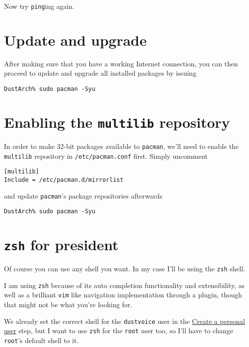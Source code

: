 \documentclass[9pt]{report}
\newenvironment{NOTE}
{\begin{tcolorbox}[colback=admonitionBG,coltitle=draculaFG,colframe=draculaBlue,colbacktitle=draculaBlue,title=NOTE]}
{\end{tcolorbox}}
\begin{document}
Now try \texttt{ping}ing again.



\newpage

\hypertarget{x-update-and-upgrade}{\section{Update and upgrade}}
After making sure that you have a working Internet connection, you can then proceed to update and upgrade all installed packages by issuing


\begin{verbatim}
DustArch% sudo pacman -Syu
\end{verbatim}


\newpage

\hypertarget{x-enabling-the-multilib-repository}{\section{Enabling the \texttt{multilib} repository}}
In order to make 32-bit packages available to \texttt{pacman}, we’ll need to enable the \texttt{multilib} repository in \texttt{/etc/pacman.conf} first.
Simply uncomment


\begin{verbatim}
[multilib]
Include = /etc/pacman.d/mirrorlist
\end{verbatim}

and update \texttt{pacman}'s package repositories afterwards


\begin{verbatim}
DustArch% sudo pacman -Syu
\end{verbatim}


\newpage

\hypertarget{x-zsh-for-president}{\section{\texttt{zsh} for president}}
Of course you can use any shell you want.
In my case I’ll be using the \texttt{zsh} shell.


\begin{NOTE}
    I am using \texttt{zsh} because of its auto completion functionality and extensibility, as well as a brilliant \texttt{vim} like navigation implementation through a plugin, though that might not be what you’re looking for.

\end{NOTE}
We already set the correct shell for the \texttt{dustvoice} user in the \hyperlink{create-a-personal-user}{Create a personal user} step, but I want to use \texttt{zsh} for the \texttt{root} user too, so I’ll have to change \texttt{root}'s default shell to it.
\end{document}
